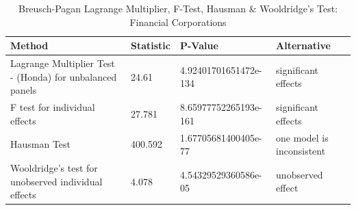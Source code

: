 \begin{table}[ht]
\centering
\caption{Breusch-Pagan Lagrange Multiplier, F-Test, Hausman & Wooldridge's Test: Financial Corporations} 
\begingroup\small
\begin{tabular}{llll}
  \toprule
Method & Statistic & P-Value & Alternative \\ 
  \midrule
Lagrange Multiplier Test -  (Honda) for unbalanced panels & 24.61 & 4.92401701651472e-134 & significant effects \\ 
  F test for individual effects & 27.781 & 8.65977752265193e-161 & significant effects \\ 
  Hausman Test & 400.592 & 1.67705681400405e-77 & one model is inconsistent \\ 
  Wooldridge's test for unobserved individual effects & 4.078 & 4.54329529360586e-05 & unobserved effect \\ 
   \bottomrule
\end{tabular}
\endgroup
\end{table}
